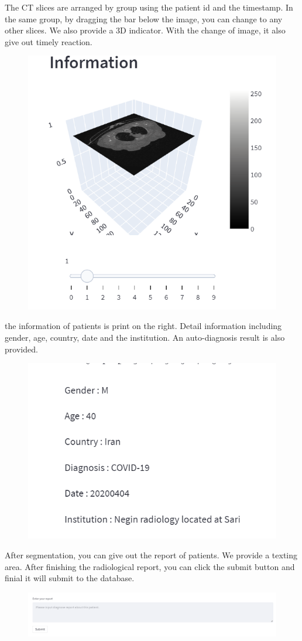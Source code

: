 \documentclass[
]{dtuposter}
\begin{document}
\begin{dtupostercontent}
\begin{figure}
\end{figure}
\par{The CT slices are arranged by group using the patient id and the timestamp. In the same group, by dragging the bar below the image, you can change to any other slices. We also provide a 3D indicator. With the change of image, it also give out timely reaction.}
\begin{figure}
    \centering\includegraphics[width=.5\linewidth,origin=c]{external/figure/3dindicator.png}
\end{figure}
\par{the information of patients is print on the right. Detail information including gender, age, country, date and the institution. An auto-diagnosis result is also provided.}
\begin{figure}
    \centering\includegraphics[width=.5\linewidth,origin=c]{external/figure/patientinformation.png}
\end{figure}
\par{After segmentation, you can give out the report of patients. We provide a texting area. After finishing the radiological report, you can click the submit button and finial it will submit to the database.}
\begin{figure}
    \centering\includegraphics[width=.8\linewidth,origin=c]{external/figure/report.png}

\end{figure}
\end{dtupostercontent}
\end{document}
